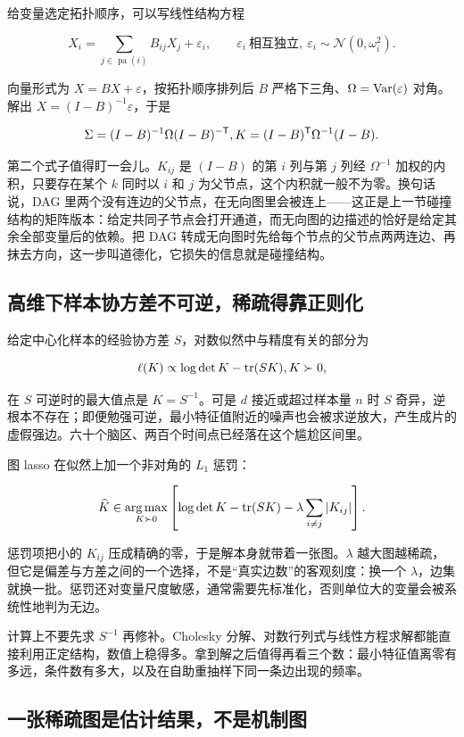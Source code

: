 给变量选定拓扑顺序，可以写线性结构方程

\[
X_i=\sum_{j\in\operatorname{pa}(i)}B_{ij}X_j+\varepsilon_i,
\qquad
\varepsilon_i\ \text{相互独立},\ \varepsilon_i\sim\mathcal N(0,\omega_i^2).
\]

向量形式为 \(X=BX+\varepsilon\)，按拓扑顺序排列后 \(B\) 严格下三角、\(\Omega=\operatorname{Var}(\varepsilon)\) 对角。解出 \(X=(I-B)^{-1}\varepsilon\)，于是

\[
\Sigma=(I-B)^{-1}\Omega(I-B)^{-\mathsf{T}},
\space
K=(I-B)^{\mathsf{T}}\Omega^{-1}(I-B).
\]

第二个式子值得盯一会儿。\(K_{ij}\) 是 \((I-B)\) 的第 \(i\) 列与第 \(j\) 列经 \(\Omega^{-1}\) 加权的内积，只要存在某个 \(k\) 同时以 \(i\) 和 \(j\) 为父节点，这个内积就一般不为零。换句话说，DAG 里两个没有连边的父节点，在无向图里会被连上——这正是上一节碰撞结构的矩阵版本：给定共同子节点会打开通道，而无向图的边描述的恰好是给定其余全部变量后的依赖。把 DAG 转成无向图时先给每个节点的父节点两两连边、再抹去方向，这一步叫道德化，它损失的信息就是碰撞结构。

\subsection{高维下样本协方差不可逆，稀疏得靠正则化}

给定中心化样本的经验协方差 \(S\)，对数似然中与精度有关的部分为

\[
\ell(K)\propto\log\det K-\operatorname{tr}(SK),\space K\succ0,
\]

在 \(S\) 可逆时的最大值点是 \(K=S^{-1}\)。可是 \(d\) 接近或超过样本量 \(n\) 时 \(S\) 奇异，逆根本不存在；即便勉强可逆，最小特征值附近的噪声也会被求逆放大，产生成片的虚假强边。六十个脑区、两百个时间点已经落在这个尴尬区间里。

图 lasso 在似然上加一个非对角的 \(L_1\) 惩罚：

\[
\widehat K\in\operatorname*{arg\,max}_{K\succ0}
\left[\log\det K-\operatorname{tr}(SK)-\lambda\sum_{i\ne j}\left|K_{ij}\right|\right].
\]

惩罚项把小的 \(K_{ij}\) 压成精确的零，于是解本身就带着一张图。\(\lambda\) 越大图越稀疏，但它是偏差与方差之间的一个选择，不是``真实边数''的客观刻度：换一个 \(\lambda\)，边集就换一批。惩罚还对变量尺度敏感，通常需要先标准化，否则单位大的变量会被系统性地判为无边。

计算上不要先求 \(S^{-1}\) 再修补。Cholesky 分解、对数行列式与线性方程求解都能直接利用正定结构，数值上稳得多。拿到解之后值得再看三个数：最小特征值离零有多远，条件数有多大，以及在自助重抽样下同一条边出现的频率。

\subsection{一张稀疏图是估计结果，不是机制图}

